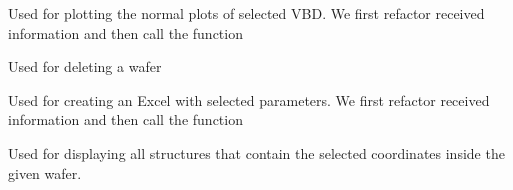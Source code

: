 \documentclass[letterpaper,10pt,english]{sphinxmanual}
\begin{document}

\begin{fulllineitems}
\label{\detokenize{app:app.VBD_normal}}
\pysigstartsignatures
{}
\pysigstopsignatures
\sphinxAtStartPar
Used for plotting the normal plots of selected VBD.
We first refactor received information and then call the function

\end{fulllineitems}


\begin{fulllineitems}
\label{\detokenize{app:app.delete_wafer}}
\pysigstartsignatures
{}
\pysigstopsignatures
\sphinxAtStartPar
Used for deleting a wafer

\end{fulllineitems}


\begin{fulllineitems}
\label{\detokenize{app:app.excel_structure_route}}
\pysigstartsignatures
{}
\pysigstopsignatures
\sphinxAtStartPar
Used for creating an Excel with selected parameters. We first refactor received information and then call the function

\end{fulllineitems}


\begin{fulllineitems}
\label{\detokenize{app:app.filter_by_Coords}}
\pysigstartsignatures
{}
\pysigstopsignatures
\sphinxAtStartPar
Used for displaying all structures that contain the selected coordinates inside the given wafer.

\end{fulllineitems}
\end{document}
